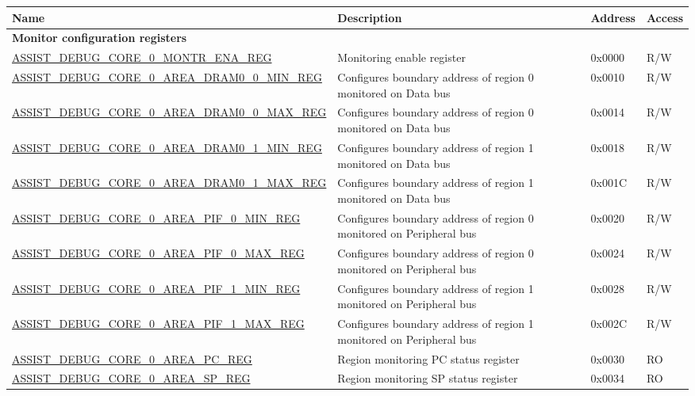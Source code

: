 \begin{longtable}{ | l| m{4cm} | l | l | }
\hline\rowcolor{lightgray}
{\bfseries Name} & {\bfseries Description} &  {\bfseries Address} & {\bfseries Access} \\ \hline
\endhead
\multicolumn{4}{|l|}{\textbf{Monitor configuration registers}} \\ \hline
\hyperref[regdesc:ASSISTDEBUGCORE0MONTRENAREG]{ASSIST\_DEBUG\_CORE\_0\_MONTR\_ENA\_REG} & Monitoring enable register & 0x0000 & R/W \\ \hline
\hyperref[regdesc:ASSISTDEBUGCORE0AREADRAM00MINREG]{ASSIST\_DEBUG\_CORE\_0\_AREA\_DRAM0\_0\_MIN\_REG} &  Configures boundary address of region 0 monitored on Data bus & 0x0010 & R/W \\ \hline
\hyperref[regdesc:ASSISTDEBUGCORE0AREADRAM00MAXREG]{ASSIST\_DEBUG\_CORE\_0\_AREA\_DRAM0\_0\_MAX\_REG} &  Configures boundary address of region 0 monitored on Data bus & 0x0014 & R/W \\ \hline
\hyperref[regdesc:ASSISTDEBUGCORE0AREADRAM01MINREG]{ASSIST\_DEBUG\_CORE\_0\_AREA\_DRAM0\_1\_MIN\_REG} &  Configures boundary address of region 1 monitored on Data bus & 0x0018 & R/W \\ \hline
\hyperref[regdesc:ASSISTDEBUGCORE0AREADRAM01MAXREG]{ASSIST\_DEBUG\_CORE\_0\_AREA\_DRAM0\_1\_MAX\_REG} & Configures boundary address of region 1 monitored on Data bus & 0x001C & R/W \\ \hline
\hyperref[regdesc:ASSISTDEBUGCORE0AREAPIF0MINREG]{ASSIST\_DEBUG\_CORE\_0\_AREA\_PIF\_0\_MIN\_REG} & Configures boundary address of region 0 monitored on Peripheral bus & 0x0020 & R/W \\ \hline
\hyperref[regdesc:ASSISTDEBUGCORE0AREAPIF0MAXREG]{ASSIST\_DEBUG\_CORE\_0\_AREA\_PIF\_0\_MAX\_REG} & Configures boundary address of region 0 monitored on Peripheral bus & 0x0024 & R/W \\ \hline
\hyperref[regdesc:ASSISTDEBUGCORE0AREAPIF1MINREG]{ASSIST\_DEBUG\_CORE\_0\_AREA\_PIF\_1\_MIN\_REG} & Configures boundary address of region 1 monitored on Peripheral bus & 0x0028 & R/W \\ \hline
\hyperref[regdesc:ASSISTDEBUGCORE0AREAPIF1MAXREG]{ASSIST\_DEBUG\_CORE\_0\_AREA\_PIF\_1\_MAX\_REG} & Configures boundary address of region 1 monitored on Peripheral bus & 0x002C & R/W \\ \hline
\hyperref[regdesc:ASSISTDEBUGCORE0AREAPCREG]{ASSIST\_DEBUG\_CORE\_0\_AREA\_PC\_REG} & Region monitoring PC status register  & 0x0030 & RO \\ \hline
\hyperref[regdesc:ASSISTDEBUGCORE0AREASPREG]{ASSIST\_DEBUG\_CORE\_0\_AREA\_SP\_REG} & Region monitoring SP status register & 0x0034 & RO \\ \hline

\end{longtable}
